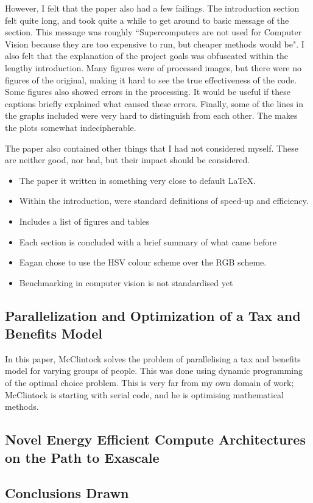 \documentclass[../main.tex]{subfiles}
\begin{document}
    However, I felt that the paper also had a few failings.
    The introduction section felt quite long, and took quite a while to get around to basic message of the section.
    This message was roughly ``Supercomputers are not used for Computer Vision because they are too expensive to run, but cheaper methods would be".
    I also felt that the explanation of the project goals was obfuscated within the lengthy introduction.
    Many figures were of processed images, but there were no figures of the original, making it hard to see the true effectiveness of the code.
    Some figures also showed errors in the processing.
    It would be useful if these captions briefly explained what caused these errors.
    Finally, some of the lines in the graphs included were very hard to distinguish from each other.
    The makes the plots somewhat indecipherable.  

    The paper also contained other things that I had not considered myself.
    These are neither good, nor bad, but their impact should be considered.
    \begin{itemize}
      \item The paper it written in something very close to default \LaTeX.
      \item Within the introduction, were standard definitions of speed-up and efficiency.
      \item Includes a list of figures and tables
      \item Each section is concluded with a brief summary of what came before
      \item Eagan chose to use the HSV colour scheme over the RGB scheme.
      \item Benchmarking in computer vision is not standardised yet
    \end{itemize}
  \subsection{Parallelization and Optimization of a Tax and Benefits Model}
    In this paper, McClintock solves the problem of parallelising a tax and benefits model for varying groups of people.
    This was done using dynamic programming of the optimal choice problem.
    This is very far from my own domain of work; McClintock is starting with serial code, and he is optimising mathematical methods.

    \begin{itemize}
    \end{itemize}
  \subsection{Novel Energy Efficient Compute Architectures on the Path to Exascale}
  \subsection{Conclusions Drawn}
\end{document}
